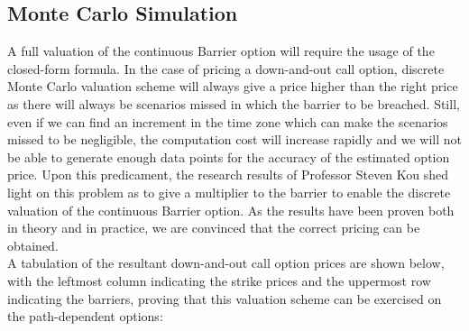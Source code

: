 \subsection{Monte Carlo Simulation}
A full valuation of the continuous Barrier option will require the usage of the closed-form formula. In the case of pricing a down-and-out call option, discrete Monte Carlo valuation scheme will always give a price higher than the right price as there will always be scenarios missed in which the barrier to be breached. Still, even if we can find an increment in the time zone which can make the scenarios missed to be negligible, the computation cost will increase rapidly and we will not be able to generate enough data points for the accuracy of the estimated option price. Upon this predicament, the research results of Professor Steven Kou shed light on this problem as to give a multiplier to the barrier to enable the discrete valuation of the continuous Barrier option. As the results have been proven both in theory and in practice, we are convinced that the correct pricing can be obtained.
\\
A tabulation of the resultant down-and-out call option prices are shown below, with the leftmost column indicating the strike prices and the uppermost row indicating the barriers, proving that this valuation scheme can be exercised on the path-dependent options:
